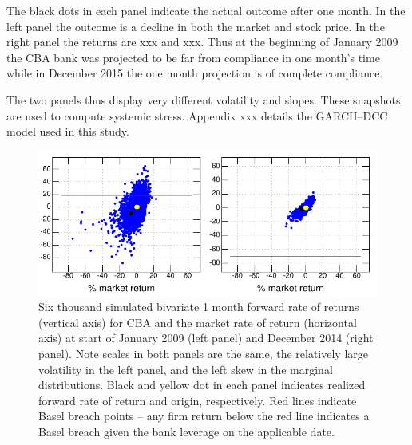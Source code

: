 \documentclass[authoryear]{elsarticle}
\begin{document}
 The black dots in each panel indicate the actual outcome after one month.    In the left panel the outcome is a decline in both  the market and stock price.    In the right panel the returns are xxx and xxx.    Thus at the beginning of January  2009 the CBA bank was projected to be far from compliance in one month's time  while in December 2015 the one month projection is of complete compliance.  
 
 The two panels thus display very different volatility and slopes.  These snapshots are used to compute systemic stress.   Appendix xxx details the GARCH--DCC model used in this study.

\begin{figure}[htbp]
\begin{center}
\includegraphics{simulation.pdf}
\caption{Six thousand simulated bivariate 1 month forward rate of returns (vertical axis) for CBA and the market rate of return (horizontal axis) at start of January 2009 (left panel)  and December 2014 (right panel). Note scales in both panels are the same, the relatively large volatility in the left panel, and the left skew in the  marginal distributions.  Black and yellow dot in each panel indicates realized forward  rate of return and origin, respectively.   Red lines indicate Basel breach points -- any firm return below the red line indicates a Basel breach given the bank leverage on the applicable date.}
\label{simulation}
\end{center}
\end{figure}
\end{document}
